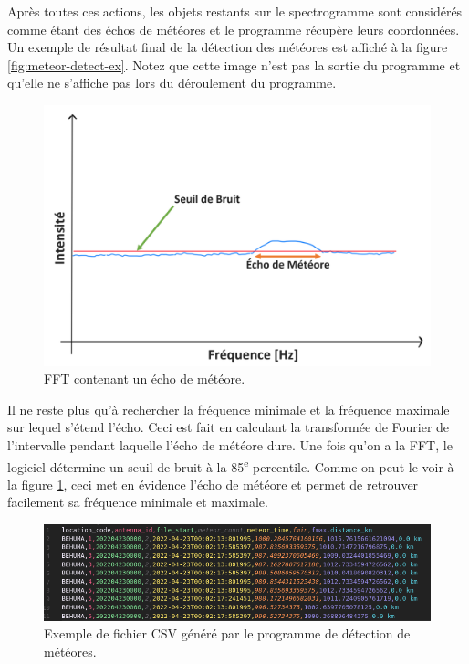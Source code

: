 \documentclass[11pt]{article}
\begin{document}
Après toutes ces actions, les objets restants sur le spectrogramme sont considérés comme étant des échos de météores et le programme récupère leurs coordonnées.
Un exemple de résultat final de la détection des météores est affiché à la figure \ref{fig:meteor-detect-ex}.
Notez que cette image n'est pas la sortie du programme et qu'elle ne s'affiche pas lors du déroulement du programme.

\begin{figure}[H]
    \begin{center}
        \includegraphics[scale=0.18]{Screenshot 2022-08-14 235407.png}
        \caption{FFT contenant un écho de météore.}
        \label{fig:meteor-fft}
    \end{center}
\end{figure}

Il ne reste plus qu'à rechercher la fréquence minimale et la fréquence maximale sur lequel s'étend l'écho.
Ceci est fait en calculant la transformée de Fourier de l'intervalle pendant laquelle l'écho de météore dure.
Une fois qu'on a la FFT, le logiciel détermine un seuil de bruit à la 85\textsuperscript{e} percentile.
Comme on peut le voir à la figure \ref{fig:meteor-fft}, ceci met en évidence l'écho de météore et permet de retrouver facilement sa fréquence minimale et maximale.\\

\begin{figure}[h]
    \begin{center}
        \includegraphics[scale=0.44]{Screenshot from 2022-05-31 16-35-06.png}
        \caption{Exemple de fichier CSV généré par le programme de détection de météores.}
        \label{fig:csv-example}
    \end{center}
\end{figure}
\end{document}
